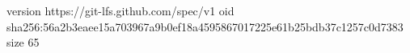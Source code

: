 version https://git-lfs.github.com/spec/v1
oid sha256:56a2b3eaee15a703967a9b0ef18a4595867017225e61b25bdb37c1257c0d7383
size 65
